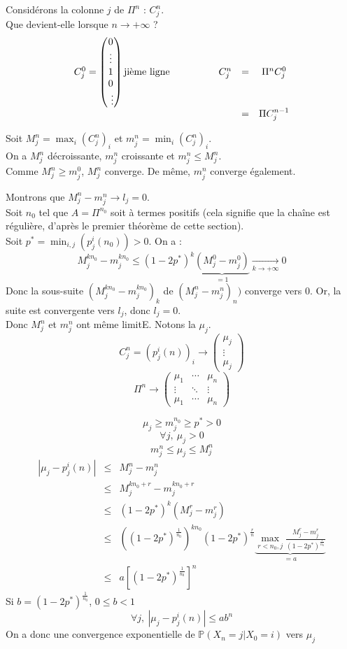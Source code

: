 \begin{dem}
Considérons la colonne $j$ de $\Pi^n$ : $C_j^n$.\\
Que devient-elle lorsque $n\to +\infty$ ?
\[\begin{array}{c c c c c}
C_j^0=\begin{pmatrix} 0\\ \vdots \\ 1 \\ 0 \\ \vdots \end{pmatrix} \text{jième ligne} & \hspace{4em} C_j^n &=& \Pi^n C_j^0 \\
& &=&\Pi C_j^{n-1}
\end{array}\]

Soit $M_j^n=\max_i (C_j^n)_i$ et $m_j^n = \min_i (C_j^n)_i$. \\
On a $M_j^n$ décroissante, $m_j^n$ croissante et $m_j^n\leq M_j^n$. \\
Comme $M_j^n\geq m_j^0$, $M_j^n$ converge. De même, $m_j^n$ converge également.

\bigskip
Montrons que $M_j^n-m_j^n\to l_j=0$.\\
Soit $n_0$ tel que $A=\Pi^{n_0}$ soit à termes positifs (cela signifie que la chaîne est régulière, d'après le premier théorème de cette section).\\
Soit $p^*=\min_{i,j} (p_j^i(n_0))>0$. On a :
\[M_j^{kn_0}-m_j^{kn_0}\leq (1-2p^*)^k\underbrace{(M_j^0-m_j^0)}_{=1}\xrightarrow[k\to +\infty]{} 0\]
Donc la sous-suite $(M_j^{kn_0}-m_j^{kn_0})_k$ de $(M_j^{n}-m_j^{n})_n)$ converge vers 0. Or, la suite est convergente vers $l_j$, donc $l_j=0$.\\
Donc $M_j^n$ et $m_j^n$ ont même limitE. Notons la $\mu_j$.
\[C_j^n=(p_j^i(n))_i \to \begin{pmatrix} \mu_j \\ \vdots \\ \mu_j \end{pmatrix}\]
\[\Pi^n \to \begin{pmatrix} \mu_1 & \cdots & \mu_n \\ \vdots & \ddots & \vdots \\ \mu_1 & \cdots & \mu_n \end{pmatrix}\]

\[\mu_j\geq m_j^{n_0}\geq p^* >0\]
\[\forall j,\ \mu_j>0\]
\[m_j^n\leq \mu_j \leq M^n_j\]
\begin{eqnarray*}
	|\mu_j-p^i_j(n)|&\leq& M_j^n-m_j^n \\
			&\leq& M_j^{kn_0+r}-m_j^{kn_0+r} \\
			&\leq& (1-2p^*)^k (M_j^r-m_j^r)\\
			&\leq& \left((1-2p^*)^{\frac{1}{n_0}} \right)^{kn_0}(1-2p^*)^{\frac{r}{n}} \underbrace{\max_{r<n_0, j} \frac{M_j^r-m_j^r}{(1-2p^*)^{\frac{r}{n_0}}}}_{=a}\\
			&\leq& a\left[ (1-2p^*)^{\frac{1}{n_0}}\right]^n
\end{eqnarray*}
Si $b=(1-2p^*)^{\frac{1}{n_0}}$, $0\leq b<1$
\[\forall j,\ |\mu_j-p_j^i(n)|\leq ab^n\]
On a donc une convergence exponentielle de $\mathbb{P}(X_n=j|X_0=i)$ vers $\mu_j$


\end{dem}
